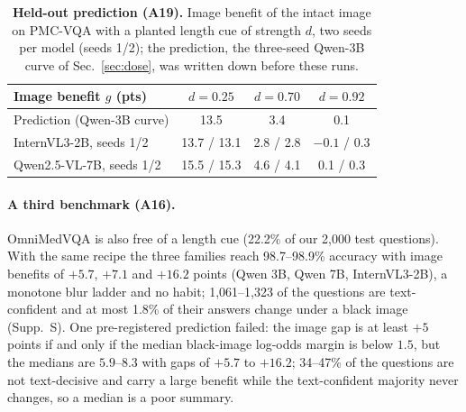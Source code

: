 \begin{table}[t]
  \centering
  \footnotesize
  \setlength{\tabcolsep}{3pt}
  \begin{tabular}{@{}lccc@{}}
    \toprule
    Image benefit $g$ (pts) & $d=0.25$ & $d=0.70$ & $d=0.92$ \\
    \midrule
    Prediction (Qwen-3B curve) & 13.5 & 3.4 & 0.1 \\
    InternVL3-2B, seeds 1/2 & 13.7 / 13.1 & 2.8 / 2.8 & $-0.1$ / 0.3 \\
    Qwen2.5-VL-7B, seeds 1/2 & 15.5 / 15.3 & 4.6 / 4.1 & 0.1 / 0.3 \\
    \bottomrule
  \end{tabular}
  \caption{\textbf{Held-out prediction (A19).} Image benefit of the intact image on PMC-VQA with a planted length cue of strength $d$, two seeds per model (seeds 1/2); the prediction, the three-seed Qwen-3B curve of Sec.~\ref{sec:dose}, was written down before these runs.}
  \label{tab:heldout}
\end{table}

\paragraph{A third benchmark (A16).}
OmniMedVQA is also free of a length cue (22.2\% of our 2{,}000 test questions).
With the same recipe the three families reach 98.7--98.9\% accuracy with image benefits of $+5.7$, $+7.1$ and $+16.2$ points (Qwen 3B, Qwen 7B, InternVL3-2B), a monotone blur ladder and no habit; 1{,}061--1{,}323 of the questions are text-confident and at most 1.8\% of their answers change under a black image (Supp.~S).
One pre-registered prediction failed: the image gap is at least $+5$ points if and only if the median black-image log-odds margin is below $1.5$, but the medians are $5.9$--$8.3$ with gaps of $+5.7$ to $+16.2$; 34--47\% of the questions are not text-decisive and carry a large benefit while the text-confident majority never changes, so a median is a poor summary.
